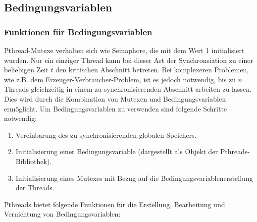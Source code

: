 \documentclass[11pt,a4paper]{article}
\begin{document}
\subsection{Bedingungsvariablen}

\subsubsection{Funktionen für Bedingungsvariablen}

Pthread-Mutexe verhalten sich wie Semaphore, die mit dem Wert 1 initialisiert wurden. 
Nur ein einziger Thread kann bei dieser Art der Synchronsiation zu einer beliebigen Zeit \(t\) den kritischen Abschnitt betreten. 
Bei komplexeren Problemen, wie z.B. dem Erzeuger-Verbraucher-Problem, ist es jedoch notwendig, bis zu \(n\) Threads gleichzeitig in einem zu synchronisierenden Abschnitt arbeiten zu lassen. 
Dies wird durch die Kombination von Mutexen und Bedingungsvariablen ermöglicht. 
Um Bedingungsvariablen zu verwenden sind folgende Schritte notwendig: 

\begin{enumerate}
	\item Vereinbarung des zu synchronisierenden globalen Speichers.
	\item Initialisierung einer Bedingungsvariable (dargestellt als Objekt der Pthreads-Bibliothek).
	\item Initialisierung eines Mutexes mit Bezug auf die Bedingungsvariablenerstellung der Threads.
\end{enumerate}

Pthreads bietet folgende Funktionen für die Erstellung, Bearbeitung und Vernichtung von Bedingungsvariablen:
\end{document}
